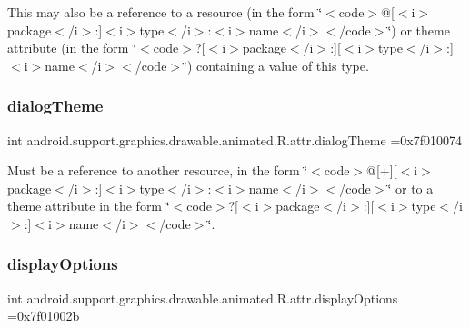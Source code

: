 This may also be a reference to a resource (in the form \char`\"{}$<$code$>$@\mbox{[}$<$i$>$package$<$/i$>$\+:\mbox{]}$<$i$>$type$<$/i$>$\+:$<$i$>$name$<$/i$>$$<$/code$>$\char`\"{}) or theme attribute (in the form \char`\"{}$<$code$>$?\mbox{[}$<$i$>$package$<$/i$>$\+:\mbox{]}\mbox{[}$<$i$>$type$<$/i$>$\+:\mbox{]}$<$i$>$name$<$/i$>$$<$/code$>$\char`\"{}) containing a value of this type. \mbox{\label{classandroid_1_1support_1_1graphics_1_1drawable_1_1animated_1_1R_1_1attr_a80c68c6c114ffc7153578f512e392f2f}} 
\subsubsection{\texorpdfstring{dialog\+Theme}{dialogTheme}}
{\footnotesize\ttfamily int android.\+support.\+graphics.\+drawable.\+animated.\+R.\+attr.\+dialog\+Theme =0x7f010074\hspace{0.3cm}{\ttfamily [static]}}

Must be a reference to another resource, in the form \char`\"{}$<$code$>$@\mbox{[}+\mbox{]}\mbox{[}$<$i$>$package$<$/i$>$\+:\mbox{]}$<$i$>$type$<$/i$>$\+:$<$i$>$name$<$/i$>$$<$/code$>$\char`\"{} or to a theme attribute in the form \char`\"{}$<$code$>$?\mbox{[}$<$i$>$package$<$/i$>$\+:\mbox{]}\mbox{[}$<$i$>$type$<$/i$>$\+:\mbox{]}$<$i$>$name$<$/i$>$$<$/code$>$\char`\"{}. \mbox{\label{classandroid_1_1support_1_1graphics_1_1drawable_1_1animated_1_1R_1_1attr_a4ea1964459d1db0a1661629b37a85652}} 
\subsubsection{\texorpdfstring{display\+Options}{displayOptions}}
{\footnotesize\ttfamily int android.\+support.\+graphics.\+drawable.\+animated.\+R.\+attr.\+display\+Options =0x7f01002b\hspace{0.3cm}{\ttfamily [static]}}

